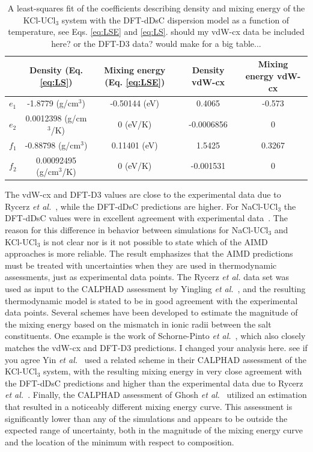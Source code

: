 \documentclass[preprint,3p,10pt,number,sort&compress]{elsarticle}
\begin{document}
\begin{table}[hb!]
\centering
\small
\caption{A least-squares fit of the coefficients describing density and mixing energy of the KCl-UCl$_3$ system with the DFT-dDsC dispersion model as a function of temperature, see Eqs. \ref{eq:LSE} and \ref{eq:LS}.{\color{red} should my vdW-cx data be included here? or the DFT-D3 data? would make for a big table...}}
\begin{tabular}{lcc|cc}
\hline
\hline
&Density (Eq. \ref{eq:LS}) &Mixing energy (Eq. \ref{eq:LSE}) & Density vdW-cx & Mixing energy vdW-cx  \\
\hline
$e_1$ &-1.8779 (g/cm$^3$) &-0.50144 (eV) & 0.4065  & -0.573  \\
$e_2$ &0.0012398 (g/cm$^3$/K) &0 (eV/K) & -0.0006856 & 0 \\
$f_1$ &-0.88798 (g/cm$^3$) &0.11401 (eV) & 1.5425 & 0.3267 \\
$f_2$ &0.00092495 (g/cm$^3$/K) &0 (eV/K) & -0.001531 & 0 \\
\hline
\hline
\end{tabular}
\label{table:LS}
\end{table}

The vdW-cx and DFT-D3 values are close to the experimental data due to Rycerz \textit{et al.}~\cite{Rycerz}, while the DFT-dDsC predictions are higher. For NaCl-UCl$_3$ the DFT-dDsC values were in excellent agreement with experimental data~\cite{Andersson}. The reason for this difference in behavior between simulations for NaCl-UCl$_3$ and KCl-UCl$_3$ is not clear nor is it not possible to state which of the AIMD approaches is more reliable. The result emphasizes that the AIMD predictions must be treated with uncertainties when they are used in thermodynamic assessments, just as experimental data points. 
The Rycerz \textit{et al.} data set was used as input to the CALPHAD assessment by Yingling \textit{et al.}~\cite{Yingling}, and the resulting thermodynamic model is stated to be in good agreement with the experimental data points. Several schemes have been developed to estimate the magnitude of the mixing energy based on the mismatch in ionic radii between the salt constituents. One example is the work of Schorne-Pinto \textit{et al.}~\cite{Pinto}, which also closely matches the vdW-cx and DFT-D3 predictions. {\color{red} I changed your analysis here. see if you agree}
Yin \textit{et al.}~\cite{YIN2020} used a related scheme in their CALPHAD assessment of the KCl-UCl$_3$ system, with the resulting mixing energy in very close agreement with the DFT-dDsC predictions and higher than the experimental data due to Rycerz \textit{et al.}~\cite{Rycerz}. Finally, the CALPHAD assessment of Ghosh \textit{et al.}~\cite{Ghosh} utilized an estimation that resulted in a noticeably different mixing energy curve. This assessment is significantly lower than any of the simulations and appears to be outside the expected range of uncertainty, both in the magnitude of the mixing energy curve and the location of the minimum with respect to composition. 
\end{document}
